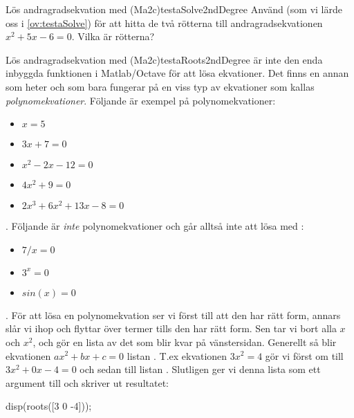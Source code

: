 
\begin{matteovning}{Lös andragradsekvation med  (Ma2c)}{testaSolve2ndDegree}
Använd  (som vi lärde oss i \autoref{ov:testaSolve}) för att hitta de två rötterna till andragradsekvationen $x^2 + 5x - 6 = 0$. Vilka är rötterna?
\end{matteovning}

\begin{matteovning}{Lös andragradsekvation med  (Ma2c)}{testaRoots2ndDegree}
 är inte den enda inbyggda funktionen i Matlab/Octave för att lösa ekvationer. Det finns en annan som heter  och som bara fungerar på en viss typ av ekvationer som kallas \emph{polynomekvationer}. Följande är exempel på polynomekvationer:

\begin{itemize}
\item $x = 5$
\item $3x + 7 = 0$
\item $x^2 - 2x - 12 = 0$
\item $4x^2 + 9 = 0$
\item $2x^3 + 6x^2 + 13x - 8 = 0$
\end{itemize}

{\color{white}.}
\newline
Följande är \emph{inte} polynomekvationer och går alltså inte att lösa med :
\begin{itemize}
\item $7 / x = 0$
\item $3^x = 0$
\item $sin(x) = 0$
\end{itemize}

{\color{white}.}
\newline
För att lösa en polynomekvation ser vi först till att den har rätt form, annars slår vi ihop och flyttar över termer tills den har rätt form. Sen tar vi bort alla $x$ och $x^2$, och gör en lista av det som blir kvar på vänstersidan. Generellt så blir ekvationen $ax^2 + bx + c = 0$ listan \cw{[a b c]}. T.ex ekvationen $3x^2 = 4$ gör vi först om till $3x^2 + 0x - 4 = 0$ och sedan till listan \cw{[3 0 -4]}. Slutligen ger vi denna lista som ett argument till  och skriver ut resultatet:
\vspace{10pt}
\begin{matlab}
disp(roots([3 0 -4]));
\end{matlab}


\end{matteovning}
